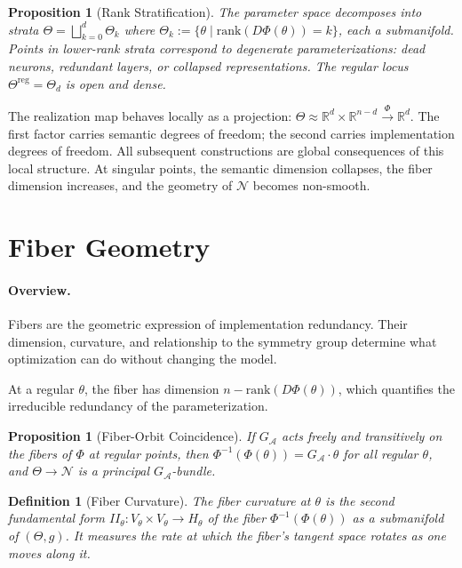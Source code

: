 \documentclass[twocolumn,10pt]{article}
\theoremstyle{thmstyle}
\newtheorem{proposition}[theorem]{Proposition}
\theoremstyle{defstyle}
\newtheorem{definition}[theorem]{Definition}
\begin{document}
\begin{proposition}[Rank Stratification]
The parameter space decomposes into strata
$\Theta = \bigsqcup_{k=0}^d \Theta_k$ where
$\Theta_k := \{\theta \mid \mathrm{rank}(D\Phi(\theta)) = k\}$,
each a submanifold. Points in lower-rank strata correspond to degenerate
parameterizations: dead neurons, redundant layers, or collapsed
representations. The regular locus $\Theta^{\mathrm{reg}} = \Theta_d$
is open and dense.
\end{proposition}

The realization map behaves locally as a projection:
$\Theta \approx \mathbb{R}^d \times \mathbb{R}^{n-d} \xrightarrow{\Phi}
\mathbb{R}^d$. The first factor carries semantic degrees of freedom; the
second carries implementation degrees of freedom. All subsequent
constructions are global consequences of this local structure. At
singular points, the semantic dimension collapses, the fiber dimension
increases, and the geometry of $\mathcal{N}$ becomes non-smooth.

\section{Fiber Geometry}
\label{sec:fiber}

\paragraph{Overview.}
Fibers are the geometric expression of implementation redundancy. Their
dimension, curvature, and relationship to the symmetry group determine
what optimization can do without changing the model.

At a regular $\theta$, the fiber has dimension
$n - \mathrm{rank}(D\Phi(\theta))$, which quantifies the irreducible
redundancy of the parameterization.

\begin{proposition}[Fiber-Orbit Coincidence]
If $G_\mathcal{A}$ acts freely and transitively on the fibers of $\Phi$
at regular points, then $\Phi^{-1}(\Phi(\theta)) = G_\mathcal{A}\cdot\theta$
for all regular $\theta$, and $\Theta \to \mathcal{N}$ is a principal
$G_\mathcal{A}$-bundle.
\end{proposition}

\begin{definition}[Fiber Curvature]
The \emph{fiber curvature} at $\theta$ is the second fundamental form
$II_\theta : V_\theta \times V_\theta \to H_\theta$ of the fiber
$\Phi^{-1}(\Phi(\theta))$ as a submanifold of $(\Theta, g)$.
It measures the rate at which the fiber's tangent space rotates as one
moves along it.
\end{definition}
\end{document}
